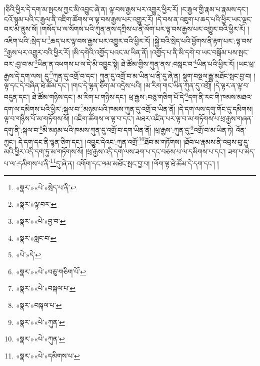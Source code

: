 །ཅིའི་ཕྱིར་དེ་དག་མ་སྤངས་ཀྱང་མི་འབྱུང་ཞེ་ན། ལྟ་བས་རྒྱས་པར་འགྱུར་ཕྱིར་རོ། །ང་རྒྱལ་གྱི་རྣམ་པ་རྣམས་དང་། ངའོ་སྙམ་པའི་ང་རྒྱལ་ནི་འཇིག་ཚོགས་ལ་ལྟ་བས་རྒྱས་པར་འགྱུར་རོ། །དེ་བས་ན་འཇུག་པ་ཆད་པའི་ཕྱིར་ཡང་ལྡང་བར་མི་ནུས་སོ། །གསོད་པ་ལ་སོགས་པའི་ཀུན་ནས་དཀྲིས་པ་ནི་ལོག་པར་ལྟ་བས་རྒྱས་པར་འགྱུར་བའི་ཕྱིར་རོ། །འཇིག་པའི་:སྲེད་པ་\footnote{«སྣར་»«པེ་»སྲེད་པ་ནི་}ཆད་པར་ལྟ་བས་རྒྱས་པར་འགྱུར་བའི་ཕྱིར་རོ། །སྐྱེ་བའི་སྲེད་པའི་ཕྱོགས་ནི་རྟག་པར་:ལྟ་བས་\footnote{«སྣར་»ལྟ་བར་}རྒྱས་པར་འགྱུར་བའི་ཕྱིར་རོ། །མི་དགེའི་འགྱོད་པའང་མ་ཡིན་ནོ། །འགྱོད་པ་ནི་མི་དགེ་བ་ཡང་བསྒོམ་པས་སྤང་བར་:བྱ་བ་མ་\footnote{«སྣར་»«པེ་»བྱ་བ་}ཡིན་ན་འཕགས་པ་ལ་དེ་མི་འབྱུང་སྟེ། ཐེ་ཚོམ་གྱིས་ཀུན་ནས་:བསླང་བ་\footnote{«སྣར་»སླང་བ་}ཡིན་པའི་ཕྱིར་རོ། །ཡང་ཕྲ་རྒྱས་དེ་དག་ལས། དུ་\footnote{«པེ་»དེ་}ཀུན་དུ་འགྲོ་བ་དང་། ཀུན་དུ་འགྲོ་བ་མ་ཡིན་པ་ནི་དུ་ཞེ་ན། སྡུག་བསྔལ་རྒྱུ་མཐོང་སྤང་བྱ་བ། །ལྟ་དང་དེ་བཞིན་ཐེ་ཚོམ་དང་། །གང་དེ་ལྷན་ཅིག་མ་འདྲེས་པའི། །མ་རིག་གང་ཡིན་ཀུན་དུ་འགྲོ། །དེ་ལྟར་ན་ལྟ་བ་བདུན་དང་། ཐེ་ཚོམ་གཉིས་དང་། མ་རིག་པ་གཉིས་དང་། ཕྲ་རྒྱས་:བཅུ་གཅིག་པོ་དེ་\footnote{«སྣར་»«པེ་»བཅུ་གཅིག་པོ་}དག་ནི་རང་གི་ཁམས་མཐའ་དག་ལ་དམིགས་པའི་ཕྱིར་:སྐལ་བ་\footnote{«སྣར་»«པེ་»བསྐལ་པ་}མཉམ་པའི་ཁམས་ཀུན་དུ་འགྲོ་བ་ཡིན་ནོ། །དེ་དག་ལས་དགུ་གོང་དུ་དམིགས། ལྟ་བ་གཉིས་པོ་མ་གཏོགས་སོ། །འཇིག་ཚོགས་ལ་ལྟ་བ་དང་། མཐར་འཛིན་པར་ལྟ་བ་མ་གཏོགས་པ་ཕྲ་རྒྱས་གཞན་དགུ་ནི་:སྐལ་བ་\footnote{«སྣར་»བསྐལ་པ་}མི་མཉམ་པའི་ཁམས་ཀུན་དུ་འགྲོ་བ་དག་ཡིན་ནོ། །ཕྲ་རྒྱས་:ཀུན་དུ་\footnote{«སྣར་»«པེ་»ཀུན་}འགྲོ་བ་མ་ཡིན་ཏེ། འོན་ཀྱང་། དེ་དག་དང་ནི་ལྷན་ཅིག་དང་། །འབྱུང་དེའང་:ཀུན་འགྲོ་\footnote{«སྣར་»«པེ་»ཀུན་}ཐོབ་མ་གཏོགས། །ཐོབ་པ་རྣམས་ནི་འབྲས་བུ་དུ་མའི་ཕྱིར་འདི་དག་ཏུ་མ་གཏོགས་སོ། །ཕྲ་རྒྱས་འདི་དག་ལས་ཟག་པ་དང་བཅས་པ་ལ་དམིགས་པ་དང་། ཟག་པ་མེད་པ་ལ་:དམིགས་པ་ནི་\footnote{«སྣར་»«པེ་»དམིགས་པ་}དུ་ཞེ་ན། འགོག་དང་ལམ་མཐོང་སྤང་བྱ་བ། །ལོག་ལྟ་ཐེ་ཚོམ་དེ་དག་དང་། །
